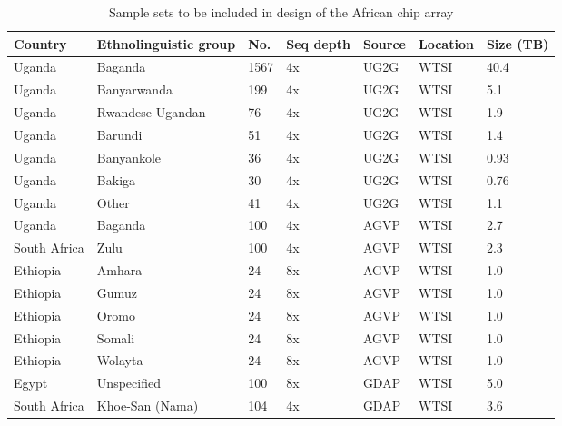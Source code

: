 \begin{landscape}
\begin{longtable}{lllllll}
\caption{Sample sets to be included in design of the African chip array}
\label{table:samples}
\hline
Country & Ethnolinguistic group & No. & Seq depth & Source & Location & Size (TB) \\
\hline
\endhead %
Uganda & Baganda & 1567 & 4x & UG2G & WTSI & 40.4 \\
Uganda & Banyarwanda & 199 & 4x & UG2G & WTSI & 5.1 \\
Uganda & Rwandese Ugandan & 76 & 4x & UG2G & WTSI & 1.9 \\
Uganda & Barundi & 51 & 4x & UG2G & WTSI & 1.4 \\
Uganda & Banyankole & 36 & 4x & UG2G & WTSI & 0.93 \\
Uganda & Bakiga & 30 & 4x & UG2G & WTSI & 0.76 \\
Uganda & Other & 41 & 4x & UG2G & WTSI & 1.1 \\
Uganda & Baganda & 100 & 4x & AGVP & WTSI & 2.7 \\
South Africa & Zulu & 100 & 4x & AGVP & WTSI & 2.3 \\
Ethiopia & Amhara & 24 & 8x & AGVP & WTSI & 1.0 \\
Ethiopia & Gumuz & 24 & 8x & AGVP & WTSI & 1.0 \\
Ethiopia & Oromo & 24 & 8x & AGVP & WTSI & 1.0 \\
Ethiopia & Somali & 24 & 8x & AGVP & WTSI & 1.0 \\
Ethiopia & Wolayta & 24 & 8x & AGVP & WTSI & 1.0 \\
Egypt & Unspecified & 100 & 8x & GDAP & WTSI & 5.0 \\
South Africa & Khoe-San (Nama) & 104 & 4x & GDAP & WTSI & 3.6 \\

\end{longtable}
\end{landscape}
